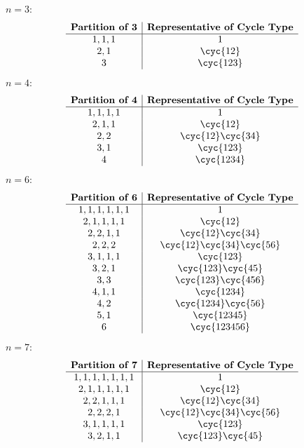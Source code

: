\begin{sol}
	$n = 3$:
	\[
		\begin{array}{c|c}
			\textbf{Partition of 3} & \textbf{Representative of Cycle Type} \\
			\hline
			1, 1, 1 & 1 \\
			2, 1 & \cyc{1 2} \\
			3 & \cyc{1 2 3}
		\end{array}
	\]
	$n = 4$:
	\[
		\begin{array}{c|c}
			\textbf{Partition of 4} & \textbf{Representative of Cycle Type} \\
			\hline
			1, 1, 1, 1 & 1 \\
			2, 1, 1 & \cyc{1 2} \\
			2, 2 & \cyc{1 2}\cyc{3 4} \\
			3, 1 & \cyc{1 2 3} \\
			4 & \cyc{1 2 3 4}
		\end{array}
	\]
	$n = 6$:
	\[
		\begin{array}{c|c}
			\textbf{Partition of 6} & \textbf{Representative of Cycle Type} \\
			\hline
			1, 1, 1, 1, 1, 1 & 1 \\
			2, 1, 1, 1, 1 & \cyc{1 2} \\
			2, 2, 1, 1 & \cyc{1 2}\cyc{3 4} \\
			2, 2, 2 & \cyc{1 2}\cyc{3 4}\cyc{5 6} \\
			3, 1, 1, 1 & \cyc{1 2 3} \\
			3, 2, 1 & \cyc{1 2 3}\cyc{4 5} \\
			3, 3 & \cyc{1 2 3}\cyc{4 5 6} \\
			4, 1, 1 & \cyc{1 2 3 4} \\
			4, 2 & \cyc{1 2 3 4}\cyc{5 6} \\
			5, 1 & \cyc{1 2 3 4 5} \\
			6 & \cyc{1 2 3 4 5 6}
		\end{array}
	\]
	$n = 7$:
	\[
		\begin{array}{c|c}
			\textbf{Partition of 7} & \textbf{Representative of Cycle Type} \\
			\hline
			1, 1, 1, 1, 1, 1, 1 & 1 \\
			2, 1, 1, 1, 1, 1 & \cyc{1 2} \\
			2, 2, 1, 1, 1 & \cyc{1 2}\cyc{3 4} \\
			2, 2, 2, 1 & \cyc{1 2}\cyc{3 4}\cyc{5 6} \\
			3, 1, 1, 1, 1 & \cyc{1 2 3} \\
			3, 2, 1, 1 & \cyc{1 2 3}\cyc{4 5} \\

\end{array}\]
\end{sol}
